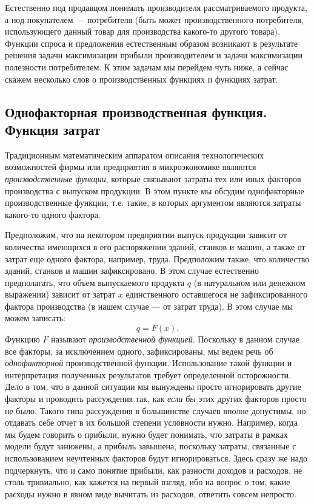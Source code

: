     Естественно под продавцом
    понимать производителя рассматриваемого продукта, а под
    покупателем --- потребителя (быть может производственного
    потребителя, использующего данный товар для производства какого-то другого
    товара). Функции спроса и предложения естественным образом
    возникают в результате решения задачи максимизации прибыли
    производителем и задачи максимизации полезности потребителем. К
    этим задачам мы перейдем чуть ниже, а сейчас скажем несколько
    слов о производственных функциях и функциях затрат.







\subsection{Однофакторная производственная функция. Функция затрат}

    Традиционным математическим аппаратом описания технологических
    возможностей фирмы или предприятия в микроэкономике являются
    \emph{производственные функции}, которые связывают затраты тех или иных
    факторов производства с выпуском продукции. В этом пункте мы
    обсудим однофакторные производственные  функции, т.е. такие, в
    которых аргументом являются затраты какого-то одного фактора.

    Предположим, что на некотором
    предприятии выпуск продукции зависит от количества имеющихся в
    его распоряжении зданий, станков и машин, а также от затрат еще
    одного фактора, например, труда. Предположим также, что количество
    зданий, станков и машин зафиксировано. В этом случае
    естественно предполагать, что объем выпускаемого продукта $q$
    (в натуральном или денежном выражении)
    зависит от затрат $x$ единственного оставшегося не зафиксированного фактора
    производства (в нашем случае --- от затрат труда). В этом случае мы можем записать:
    \[q=F(x).\]
    Функцию $F$ называют \emph{производственной функцией}. Поскольку
    в данном случае все факторы, за исключением одного,
    зафиксированы, мы ведем речь об \emph{однофакторной} производственной
    функции. Использование такой функции и интерпретация полученных
    результатов требует определенной  осторожности. Дело в том, что
    в данной ситуации мы вынуждены просто игнорировать другие факторы
    и проводить рассуждения так, как \emph{если бы} этих других
    факторов просто не было. Такого типа рассуждения в большинстве
    случаев вполне допустимы, но отдавать себе отчет в их большой
    степени условности нужно. Например, когда мы будем говорить о
    прибыли, нужно будет понимать, что затраты в рамках модели будут
    занижены, а прибыль завышена, поскольку затраты, связанные с использованием
    неучтенных факторов будут игнорироваться. Здесь сразу же надо подчеркнуть,
    что и само понятие прибыли, как разности доходов и расходов, не
    столь тривиально, как кажется на первый взгляд, ибо на вопрос
    о том, какие расходы нужно
    в явном виде вычитать из расходов, ответить совсем непросто.



